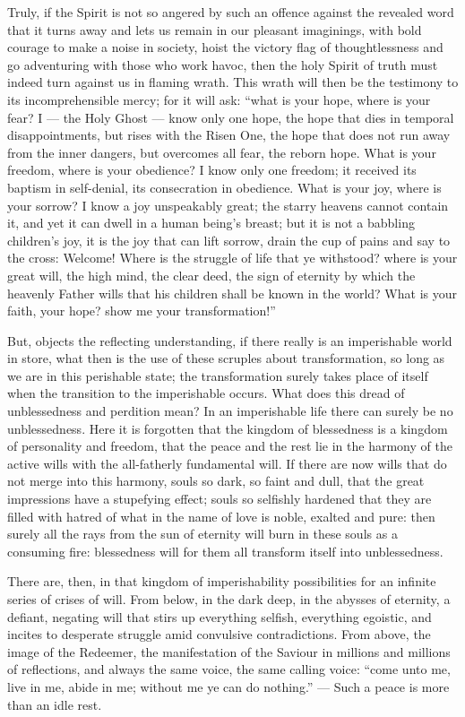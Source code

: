 \documentclass[12pt,a4paper,openany]{book}
\newcommand{\opage}[1]{\marginnote{\footnotesize\textit{[#1]}}}
\begin{document}
Truly, if the Spirit is not so angered by such an offence against the revealed word that it turns away and lets us
remain in our pleasant imaginings, with bold courage to make a noise in society, hoist the victory flag of
thoughtlessness and go adventuring with those who work havoc, then the holy Spirit of truth must indeed turn against
us in flaming wrath. This wrath will then be the testimony to its incomprehensible mercy; for it will ask: ``what is
your hope, where is your fear? I --- the Holy Ghost --- know only one hope, the hope that dies in temporal
disappointments, but rises with the Risen One, the hope that does not run away from the inner dangers, but overcomes
all fear, the reborn hope. What is your freedom, where is your obedience? I know only one freedom; it received its
baptism in self-denial, its consecration in obedience. What is your joy, where is your sorrow? I know a joy
unspeakably great; the starry heavens cannot contain it, and yet it can dwell in a human being's breast; but it is
not a babbling
\setcounter{footnote}{0}%
\opage{102}children's joy, it is the joy that can lift sorrow, drain the cup of pains and say to the cross: Welcome!
Where is the struggle of life that ye withstood? where is your great will, the high mind, the clear deed, the sign of
eternity by which the heavenly Father wills that his children shall be known in the world? What is your faith, your
hope? show me your transformation!''

But, objects the reflecting understanding, if there really is an imperishable world in store, what then is the use of
these scruples about transformation, so long as we are in this perishable state; the transformation surely takes place
of itself when the transition to the imperishable occurs. What does this dread of unblessedness and perdition mean? In
an imperishable life there can surely be no unblessedness. Here it is forgotten that the kingdom of blessedness is a
kingdom of personality and freedom, that the peace and the rest lie in the harmony of the active wills with the
all-fatherly fundamental will. If there are now wills that do not merge into this harmony, souls so dark, so faint and
dull, that the great impressions have a stupefying effect; souls so selfishly hardened that they are filled with
hatred of what in the name of love is noble, exalted and pure: then surely all the rays from the sun of eternity will
burn in these souls as a consuming fire: blessedness will for them all transform itself into unblessedness.

There are, then, in that kingdom of imperishability possibilities for an infinite series of crises of will. From
below, in the dark deep, in the abysses of eternity, a defiant, negating will that stirs up everything selfish,
everything egoistic, and incites to desperate struggle amid convulsive contradictions. From above, the image of the
Redeemer, the manifestation of the Saviour in millions and millions of
\setcounter{footnote}{0}%
\opage{103}reflections, and always the same voice, the same calling voice: ``come unto me, live in me, abide in me;
without me ye can do nothing.'' --- Such a peace is more than an idle rest.
\end{document}
